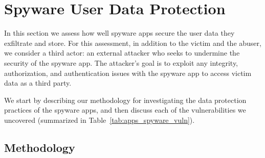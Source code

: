\section{Spyware User Data Protection}
\label{sec:data-leak}



In this section we assess how well spyware apps secure the user data they exfiltrate and store.
For this assessment, in addition to the victim and the abuser, we
consider a third actor: an external attacker who seeks to undermine the
security of the spyware app.  The attacker's goal is to exploit any
integrity, authorization, and authentication issues with the spyware
app to access victim data as a third party.



We start by describing our
methodology for investigating the data protection practices of the
spyware apps, and then discuss each of the vulnerabilities we uncovered (summarized in Table~\ref{tab:apps_spyware_vuln}).

\subsection{Methodology}
\label{subsec:experiemental_setup}

